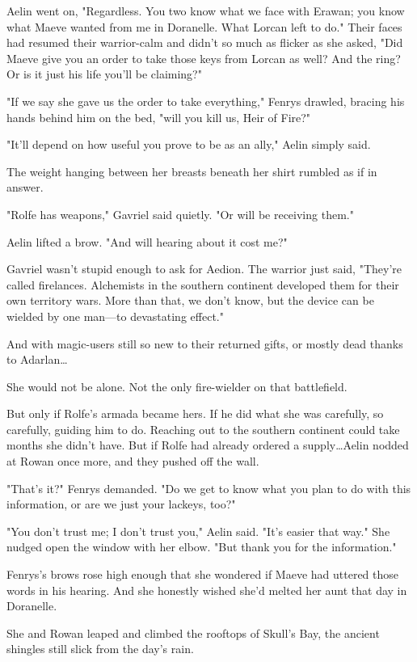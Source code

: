 Aelin went on, "Regardless.
You two know what we face with Erawan; you know what Maeve wanted from me in Doranelle.
What Lorcan left to do."
Their faces had resumed their warrior-calm and didn't so much as flicker as she asked, "Did Maeve give you an order to take those keys from Lorcan as well?
And the ring?
Or is it just his life you'll be claiming?"

"If we say she gave us the order to take everything," Fenrys drawled, bracing his hands behind him on the bed, "will you kill us, Heir of Fire?"

"It'll depend on how useful you prove to be as an ally," Aelin simply said.

The weight hanging between her breasts beneath her shirt rumbled as if in answer.

"Rolfe has weapons," Gavriel said quietly.
"Or will be receiving them."

Aelin lifted a brow.
"And will hearing about it cost me?"

Gavriel wasn't stupid enough to ask for Aedion.
The warrior just said, "They're called firelances.
Alchemists in the southern continent developed them for their own territory wars.
More than that, we don't know, but the device can be wielded by one man---to devastating effect."

And with magic-users still so new to their returned gifts, or mostly dead thanks to Adarlan\ldots{}

She would not be alone.
Not the only fire-wielder on that battlefield.

But only if Rolfe's armada became hers.
If he did what she was carefully, so carefully, guiding him to do.
Reaching out to the southern continent could take months she didn't have.
But if Rolfe had already ordered a supply\ldots Aelin nodded at Rowan once more, and they pushed off the wall.

"That's it?"
Fenrys demanded.
"Do we get to know what you plan to do with this information, or are we just your lackeys, too?"

"You don't trust me; I don't trust you," Aelin said.
"It's easier that way."
She nudged open the window with her elbow.
"But thank you for the information."

Fenrys's brows rose high enough that she wondered if Maeve had uttered those words in his hearing.
And she honestly wished she'd melted her aunt that day in Doranelle.

She and Rowan leaped and climbed the rooftops of Skull's Bay, the ancient shingles still slick from the day's rain.

